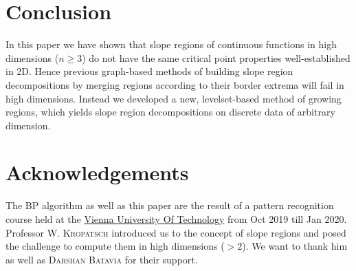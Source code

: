 \documentclass[11pt,twoside,twocolumn,a4paper]{article}
\theoremstyle{plain}
\theoremstyle{definition}
\begin{document}
\section{Conclusion}
In this paper we have shown that slope regions of continuous functions in high dimensions ($n\geq 3$) do not have the same critical point properties well-established in 2D.
Hence previous graph-based methods of building slope region decompositions by merging regions according to their border extrema will fail in high dimensions.
Instead we developed a new, levelset-based method of growing regions, which yields slope region decompositions on discrete data of arbitrary dimension.

\section{Acknowledgements}
The BP algorithm as well as this paper are the result of a pattern recognition course held at the \href{https://www.tuwien.at/en/}{Vienna University Of Technology} from Oct 2019 till Jan 2020. Professor \textsc{W. Kropatsch} introduced us to the concept of slope regions and posed the challenge to compute them in high dimensions ($>2$). We want to thank him as well as \textsc{Darshan Batavia} for their support.

{\small


}
\end{document}
